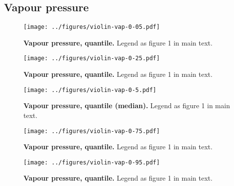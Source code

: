 \documentclass[12pt]{report}
\begin{document}
\subsection{Vapour pressure}
\begin{figure}[h!]
  \begin{center}
    \texttt{[image: ../figures/violin-vap-0-05.pdf]}
  \end{center}
  \caption{\textbf{Vapour pressure,  quantile.} Legend as
    figure 1 in main text.}
\end{figure}
\begin{figure}[h!]
  \begin{center}
    \texttt{[image: ../figures/violin-vap-0-25.pdf]}
  \end{center}
  \caption{\textbf{Vapour pressure,  quantile.} Legend as
    figure 1 in main text.}
\end{figure}
\begin{figure}[h!]
  \begin{center}
    \texttt{[image: ../figures/violin-vap-0-5.pdf]}
  \end{center}
  \caption{\textbf{Vapour pressure,  quantile (median).}
    Legend as figure 1 in main text.}
\end{figure}
\begin{figure}[h!]
  \begin{center}
    \texttt{[image: ../figures/violin-vap-0-75.pdf]}
  \end{center}
  \caption{\textbf{Vapour pressure,  quantile.} Legend as
    figure 1 in main text.}
\end{figure}
\begin{figure}[h!]
  \begin{center}
    \texttt{[image: ../figures/violin-vap-0-95.pdf]}
  \end{center}
  \caption{\textbf{Vapour pressure,  quantile.} Legend as
    figure 1 in main text.}
\end{figure}

\clearpage
\end{document}
